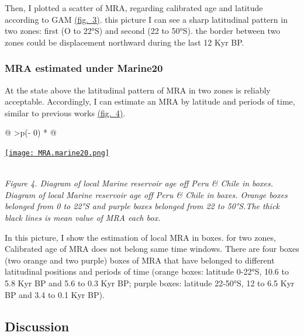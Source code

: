 \documentclass[
]{article}
\begin{document}
Then, I plotted a scatter of MRA, regarding calibrated age and latitude
according to GAM
\protect\hyperlink{latitudinal-distribution-of-mra}{(fig.~3)}. this
picture I can see a sharp latitudinal pattern in two zones: first (O to
22°S) and second (22 to 50°S). the border between two zones could be
displacement northward during the last 12 Kyr BP.

\hypertarget{mra-estimated-under-marine20}{%
\subsubsection{MRA estimated under
Marine20}\label{mra-estimated-under-marine20}}

At the state above the latitudinal pattern of MRA in two zones is
reliably acceptable. Accordingly, I can estimate an MRA by latitude and
periods of time, similar to previous works
\protect\hyperlink{mra-estimated-under-marine20}{(fig.~4)}.

\begin{longtable}[]{@{}
  >{\centering\arraybackslash}p{(\columnwidth - 0\tabcolsep) * }@{}}
\toprule
\begin{minipage}[b]{\linewidth}\centering
\href{https://github.com/jasb3110/Radiocarbon-reservoir/blob/db842ff0620d55ea5ca5ceec0d96a369406b6e3c/MRA.marine20.png?raw=true}{\texttt{[image: MRA.marine20.png]}}
\end{minipage} \\
\midrule
\endhead
\emph{Figure 4. Diagram of local Marine reservoir age off Peru \& Chile
in boxes. Diagram of local Marine reservoir age off Peru \& Chile in
boxes. Orange boxes belonged from 0 to 22°S and purple boxes belonged
from 22 to 50°S.The thick black lines is mean value of MRA each box.} \\
\bottomrule
\end{longtable}

In this picture, I show the estimation of local MRA in boxes. for two
zones, Calibrated age of MRA does not belong same time windows. There
are four boxes (two orange and two purple) boxes of MRA that have
belonged to different latitudinal positions and periods of time (orange
boxes: latitude 0-22°S, 10.6 to 5.8 Kyr BP and 5.6 to 0.3 Kyr BP; purple
boxes: latitude 22-50°S, 12 to 6.5 Kyr BP and 3.4 to 0.1 Kyr BP).

\hypertarget{discussion}{%
\subsection{Discussion}\label{discussion}}
\end{document}
